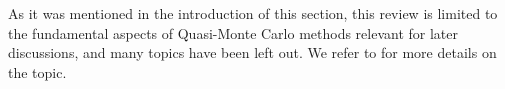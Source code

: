 \documentclass[twoside,11pt]{book}
\newtheorem{theorem}{Theorem}
\newtheorem{definition}{Definition}
\numberwithin{theorem}{chapter}
\numberwithin{definition}{chapter}
\numberwithin{proposition}{chapter}
\numberwithin{corollary}{chapter}
\numberwithin{example}{chapter}
\numberwithin{lemma}{chapter}
\numberwithin{assumption}{chapter}
\begin{document}






As it was mentioned in the introduction of this section, this review is limited to the fundamental aspects of Quasi-Monte Carlo methods relevant for later discussions, and many topics have been left out. We refer to \citep{DiPi14} for more details on the topic. 



\end{document}
